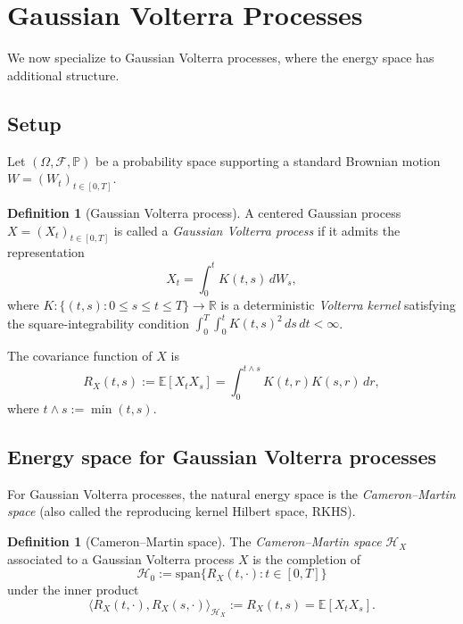 \documentclass[11pt,a4paper]{article}
\theoremstyle{plain}
\theoremstyle{definition}
\newtheorem{definition}[theorem]{Definition}
\theoremstyle{remark}
\newcommand{\R}{\mathbb{R}}
\newcommand{\E}{\mathbb{E}}
\newcommand{\ip}[2]{\langle #1, #2 \rangle}
\newcommand{\Prob}{\mathbb{P}}
\newcommand{\HX}{\mathcal{H}_X}
\begin{document}
\section{Gaussian Volterra Processes}\label{sec:gaussian}

We now specialize to Gaussian Volterra processes, where the energy space has additional structure.

\subsection{Setup}

Let $(\Omega, \mathcal{F}, \Prob)$ be a probability space supporting a standard Brownian motion $W = (W_t)_{t\in[0,T]}$.

\begin{definition}[Gaussian Volterra process]\label{def:volterra}
A centered Gaussian process $X = (X_t)_{t\in[0,T]}$ is called a \emph{Gaussian Volterra process} if it admits the representation
\begin{equation}\label{eq:volterra-rep}
X_t = \int_0^t K(t, s) \, dW_s,
\end{equation}
where $K : \{(t, s) : 0 \leq s \leq t \leq T\} \to \R$ is a deterministic \emph{Volterra kernel} satisfying the square-integrability condition $\int_0^T \int_0^t K(t, s)^2 \, ds \, dt < \infty$.
\end{definition}

The covariance function of $X$ is
\begin{equation}\label{eq:covariance}
R_X(t, s) := \E[X_t X_s] = \int_0^{t\wedge s} K(t, r)K(s, r) \, dr,
\end{equation}
where $t \wedge s := \min(t,s)$.

\subsection{Energy space for Gaussian Volterra processes}

For Gaussian Volterra processes, the natural energy space is the \emph{Cameron--Martin space} (also called the reproducing kernel Hilbert space, RKHS).

\begin{definition}[Cameron--Martin space]\label{def:CM}
The \emph{Cameron--Martin space} $\HX$ associated to a Gaussian Volterra process $X$ is the completion of
\[
\mathcal{H}_0 := \mathrm{span}\{R_X(t, \cdot) : t \in [0, T]\}
\]
under the inner product
\begin{equation}\label{eq:CM-ip}
\ip{R_X(t, \cdot)}{R_X(s, \cdot)}_{\HX} := R_X(t, s) = \E[X_t X_s].
\end{equation}
\end{definition}
\end{document}

